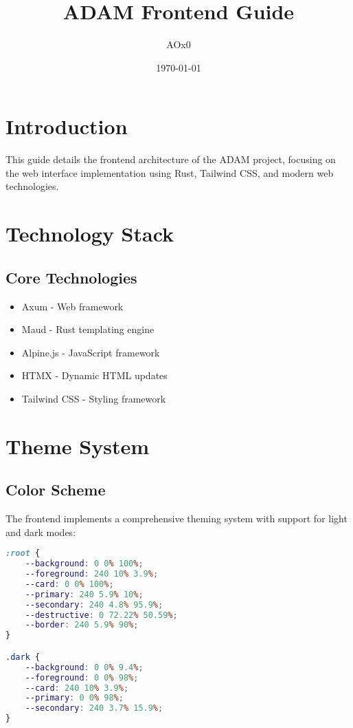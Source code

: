 \documentclass{article}
\title{ADAM Frontend Guide}
\author{AOx0}
\date{\today}
\begin{document}
\maketitle

\section{Introduction}
This guide details the frontend architecture of the ADAM project, focusing on the web interface implementation using Rust, Tailwind CSS, and modern web technologies.

\section{Technology Stack}

\subsection{Core Technologies}
\begin{itemize}
    \item Axum - Web framework
    \item Maud - Rust templating engine
    \item Alpine.js - JavaScript framework
    \item HTMX - Dynamic HTML updates
    \item Tailwind CSS - Styling framework
\end{itemize}

\section{Theme System}

\subsection{Color Scheme}
The frontend implements a comprehensive theming system with support for light and dark modes:

\begin{lstlisting}[language=css]
:root {
    --background: 0 0% 100%;
    --foreground: 240 10% 3.9%;
    --card: 0 0% 100%;
    --primary: 240 5.9% 10%;
    --secondary: 240 4.8% 95.9%;
    --destructive: 0 72.22% 50.59%;
    --border: 240 5.9% 90%;
}

.dark {
    --background: 0 0% 9.4%;
    --foreground: 0 0% 98%;
    --card: 240 10% 3.9%;
    --primary: 0 0% 98%;
    --secondary: 240 3.7% 15.9%;
}
\end{lstlisting}
\end{document}
